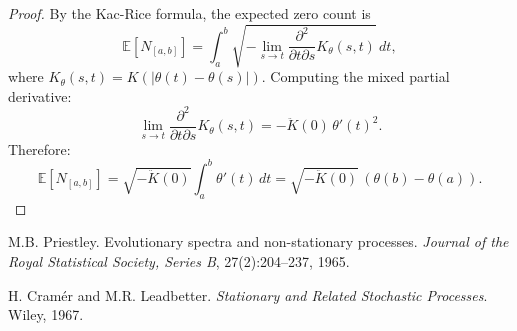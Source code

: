 \documentclass[11pt]{article}
\begin{document}
\begin{proof}
By the Kac-Rice formula, the expected zero count is
\begin{equation}\label{eq:kac_rice}
    \mathbb{E}[N_{[a,b]}] = \int_a^b \sqrt{-\lim_{s\to t}\frac{\partial^2}{\partial t\partial s}K_\theta(s,t)}\,dt,
\end{equation}
where $K_\theta(s,t)=K(|\theta(t)-\theta(s)|)$. Computing the mixed partial derivative:
\begin{equation}\label{eq:mixed_partial}
    \lim_{s\to t}\frac{\partial^2}{\partial t\partial s}K_\theta(s,t) = -\ddot{K}(0)\,\theta'(t)^2.
\end{equation}
Therefore:
\begin{equation}\label{eq:zero_count_integral}
    \mathbb{E}[N_{[a,b]}] = \sqrt{-\ddot{K}(0)}\int_a^b \theta'(t)\,dt = \sqrt{-\ddot{K}(0)}\,(\theta(b)-\theta(a)).
\end{equation}
\end{proof}

\begin{thebibliography}{99}
 M.B. Priestley. Evolutionary spectra and non-stationary processes. \emph{Journal of the Royal Statistical Society, Series B}, 27(2):204--237, 1965.

 H. Cramér and M.R. Leadbetter. \emph{Stationary and Related Stochastic Processes}. Wiley, 1967.
\end{thebibliography}
\end{document}

